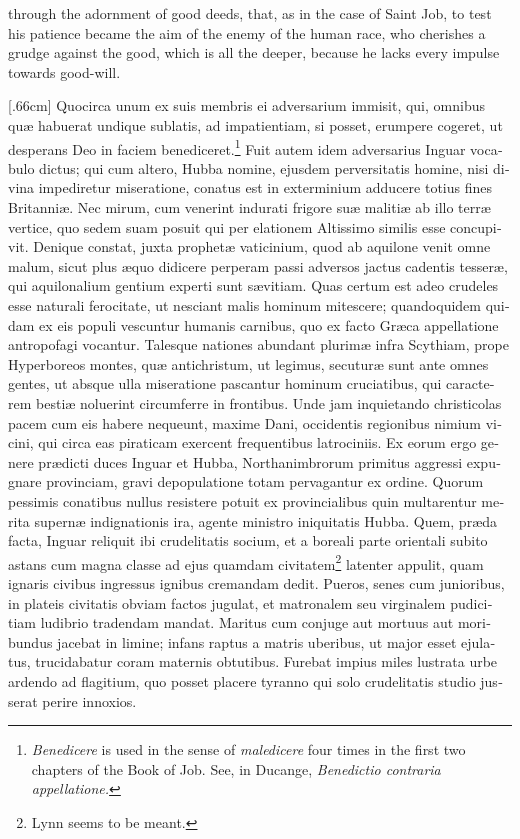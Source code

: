 \documentclass[10pt]{book}
\begin{document}
\vspace{-2\parskip}
\vspace{-3\lineskip}
through the adornment of good deeds, that, as in the case of Saint Job, to test his patience became the aim of the enemy of the human race, who cherishes a grudge against the good, which is all the deeper, because he lacks every impulse towards good-will.

\begin{paracol}{2}

\begin{otherlanguage}{latin}
\reversemarginpar
{}[.66cm]
Quocirca unum ex suis membris ei adversarium immisit, qui, omnibus qu\ae{} habuerat undique sublatis, ad impatientiam, si posset, erumpere cogeret, ut desperans Deo in faciem benediceret.\footnote[\textdagger]{\emph{Benedicere} is used in the sense of \emph{maledicere} four times in the first two chapters of the Book of Job. See, in Ducange, \emph{Benedictio contraria appellatione.}} Fuit autem idem adversarius Inguar vocabulo dictus; qui cum altero, Hubba nomine, ejusdem perversitatis homine, nisi divina impediretur miseratione, conatus est in exterminium adducere totius fines Britanni\ae{}. Nec mirum, cum venerint indurati frigore su\ae{} maliti\ae{} ab illo terr\ae{} vertice, quo sedem suam posuit qui per elationem Altissimo similis esse concupivit. Denique constat, juxta prophet\ae{} vaticinium, quod ab aquilone venit omne malum, sicut plus \ae{}quo didicere perperam passi adversos jactus cadentis tesser\ae{}, qui aquilonalium gentium experti sunt s\ae{}vitiam. Quas certum est adeo crudeles esse naturali ferocitate, ut nesciant malis hominum mitescere; quandoquidem quidam ex eis populi vescuntur humanis carnibus, quo ex facto Gr\ae{}ca appellatione antropofagi vocantur. Talesque nationes abundant plurim\ae{} infra Scythiam, prope Hyperboreos montes, qu\ae{} antichristum, ut legimus, secutur\ae{} sunt ante omnes gentes, ut absque ulla miseratione pascantur hominum cruciatibus, qui caracterem besti\ae{} noluerint circumferre in frontibus. Unde jam inquietando christicolas pacem cum eis habere nequeunt, maxime Dani, occidentis regionibus nimium vicini, qui circa eas piraticam exercent frequentibus latrociniis. Ex eorum ergo genere pr\ae{}dicti duces Inguar et Hubba, Northanimbrorum primitus aggressi expugnare provinciam, gravi depopulatione totam pervagantur ex ordine. Quorum pessimis conatibus nullus resistere potuit ex provincialibus quin multarentur merita supern\ae{} indignationis ira, agente ministro iniquitatis Hubba. Quem, pr\ae{}da facta, Inguar reliquit ibi crudelitatis socium, et a boreali parte orientali subito astans cum magna classe ad ejus quamdam civitatem\footnote[\textdagger]{Lynn seems to be meant.} latenter appulit, quam ignaris civibus ingressus ignibus cremandam dedit. Pueros, senes cum junioribus, in plateis civitatis obviam factos jugulat, et matronalem seu virginalem pudicitiam ludibrio tradendam mandat. Maritus cum conjuge aut mortuus aut moribundus jacebat in limine; infans raptus a matris uberibus, ut major esset ejulatus, trucidabatur coram maternis obtutibus. Furebat impius miles lustrata urbe ardendo ad flagitium, quo posset placere tyranno qui solo crudelitatis studio jusserat perire innoxios.

\end{otherlanguage}
\end{paracol}
\end{document}
